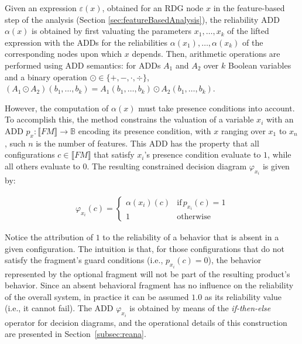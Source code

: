 Given an expression $\varepsilon(x)$, obtained for an RDG node $x$ in the
feature-based step of the analysis (Section \ref{sec:featureBasedAnalysis}),
the reliability ADD $\alpha(x)$ is obtained by first valuating the parameters
$x_1, \dotsc, x_k$ of the lifted expression with the ADDs for the reliabilities
$\alpha(x_1), \dotsc, \alpha(x_k)$ of the corresponding nodes upon which $x$
depends.  Then, arithmetic operations are performed using ADD semantics: for
ADDs $A_1$ and $A_2$ over $k$ Boolean variables and a binary operation $\odot
\in \{+, -, \cdot, \div\}$, $(A_1 \odot A_2)(b_1,\dotsc,b_k) =
A_1(b_1,\dotsc,b_k) \odot A_2(b_1,\dotsc,b_k)$.

However, the computation of $\alpha(x)$ must take presence conditions into
account.  To accomplish this, the method constrains the valuation of a variable
$x_i$ with an ADD $p_{x}: \llbracket \mathit{FM} \rrbracket \to \mathbb{B}$
encoding its presence condition, with $x$ ranging over $x_1$ to $x_n$, such $n$
is the number of features.  This ADD has the property that all configurations $c
\in \llbracket \mathit{FM} \rrbracket$ that satisfy $x_i$'s presence condition
evaluate to $1$, while all others evaluate to $0$.  The resulting constrained
decision diagram $\varphi_{x_i}$ is given by:

\begin{align*}
  \varphi_{x_i}(c) = \begin{cases}
    \alpha(x_i)(c) &\mbox{if} \, p_{x_i}(c) = 1 \\
    1 &\mbox{otherwise}
  \end{cases}
\end{align*}

Notice the attribution of  $1$ to the reliability of a behavior that is absent
in a given configuration.  The intuition is that, for those configurations that
do not satisfy the fragment's guard conditions (i.e., $p_{x_i}(c) = 0$), the
behavior represented by the optional fragment will not be part of the resulting
product's behavior.  Since an absent behavioral fragment has no influence on the
reliability of the overall system, in practice it can be assumed $1.0$ as its
reliability value (i.e., it cannot fail).  The ADD $\varphi_{x_i}$ is obtained
by means of the \emph{if-then-else} operator for decision diagrams, and the
operational details of this construction are presented in
Section~\ref{subsec:reana}.

